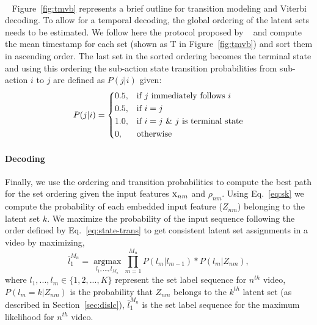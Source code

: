 \documentclass[final]{cvpr}
\begin{document}
\\
~\label{sec:tmvb}
\noindent Figure~\ref{fig:tmvb} represents a brief outline for transition modeling and Viterbi decoding. To allow for a temporal decoding, the global ordering of the latent sets needs to be estimated. We follow here the protocol proposed by ~\cite{kukleva2019unsupervised} and compute the mean timestamp for each set (shown as T in Figure~\ref{fig:tmvb}) and sort them in ascending order. 
The last set in the sorted ordering becomes the terminal state and using this ordering the sub-action state transition probabilities  from sub-action $i$ to $j$ are defined as $P(j|i)$ given:
\vspace{-0.3cm}
\begin{equation}
\label{eq:state-trans}
    P(j|i) = 
    \begin{dcases}
         0.5,& \text{if  $j$ immediately follows $i$ }\\
         0.5, & \text{if $i = j$} \\
         1.0, & \text{if $i = j$ \& $j$ is terminal state} \\
         0, & \text{otherwise}
    \end{dcases}
\end{equation}
\paragraph{Decoding}
\par Finally, we use the ordering and transition probabilities to compute the best path for the set ordering given the input features $\textsc{x}_{nm}$ and $\rho_{nm}$. 
Using Eq.~\ref{eq:sk} we compute the probability of each embedded input feature ($Z_{nm}$) belonging to the latent set $k$. 
We maximize the probability of the input sequence following the order defined by Eq.~\ref{eq:state-trans} to get consistent latent set assignments in a video by maximizing,
\vspace{-0.3cm}
\begin{equation}
    \label{eq:dec}
    \bar{l}_{1}^{M_{n}} = {\operatorname*{argmax}_{l_{1},...,l_{M_{n}}}}{\displaystyle \prod_{m=1}^{M_{n}} P(l_{m}|l_{m-1}) * P( l_{m} | Z_{nm})}, 
\end{equation}
\noindent where $l_{1}, ..., l_{m} \in \{1,2,...,K\}$ represent the set label sequence for $n^{th}$ video, $P( l_{m} = k | Z_{nm})$ is the probability that $Z_{nm}$ belongs to the $k^{th}$ latent set (as described in Section~\ref{sec:dislc}), $\bar{l}_{1}^{M_{n}}$ is the set label sequence for the maximum likelihood for $n^{th}$ video.
\end{document}
